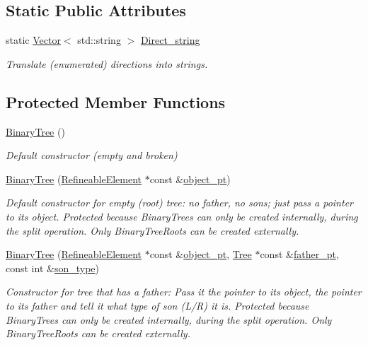 \subsection*{Static Public Attributes}
\begin{DoxyCompactItemize}
\item 
static \hyperlink{classoomph_1_1Vector}{Vector}$<$ std\+::string $>$ \hyperlink{classoomph_1_1BinaryTree_a24331ca02be2713a58833da84ed02f9b}{Direct\+\_\+string}
\begin{DoxyCompactList}\small\item\em Translate (enumerated) directions into strings. \end{DoxyCompactList}\end{DoxyCompactItemize}
\subsection*{Protected Member Functions}
\begin{DoxyCompactItemize}
\item 
\hyperlink{classoomph_1_1BinaryTree_a3ad7c1ba04813b506e2d70a82b45df9c}{Binary\+Tree} ()
\begin{DoxyCompactList}\small\item\em Default constructor (empty and broken) \end{DoxyCompactList}\item 
\hyperlink{classoomph_1_1BinaryTree_a17856140e51fd48c3441d0b48d854152}{Binary\+Tree} (\hyperlink{classoomph_1_1RefineableElement}{Refineable\+Element} $\ast$const \&\hyperlink{classoomph_1_1Tree_a2f2eeb0f1dd161f696cccc652974ff4c}{object\+\_\+pt})
\begin{DoxyCompactList}\small\item\em Default constructor for empty (root) tree\+: no father, no sons; just pass a pointer to its object. Protected because Binary\+Trees can only be created internally, during the split operation. Only Binary\+Tree\+Roots can be created externally. \end{DoxyCompactList}\item 
\hyperlink{classoomph_1_1BinaryTree_a1e1f22c07b554709b8aa76356d9f005f}{Binary\+Tree} (\hyperlink{classoomph_1_1RefineableElement}{Refineable\+Element} $\ast$const \&\hyperlink{classoomph_1_1Tree_a2f2eeb0f1dd161f696cccc652974ff4c}{object\+\_\+pt}, \hyperlink{classoomph_1_1Tree}{Tree} $\ast$const \&\hyperlink{classoomph_1_1Tree_a5f8444ddeda272b70669b8bbe929708a}{father\+\_\+pt}, const int \&\hyperlink{classoomph_1_1Tree_a7537f8fe7c896d2220eb2da03567b34d}{son\+\_\+type})
\begin{DoxyCompactList}\small\item\em Constructor for tree that has a father\+: Pass it the pointer to its object, the pointer to its father and tell it what type of son (L/R) it is. Protected because Binary\+Trees can only be created internally, during the split operation. Only Binary\+Tree\+Roots can be created externally. \end{DoxyCompactList}\end{DoxyCompactItemize}
